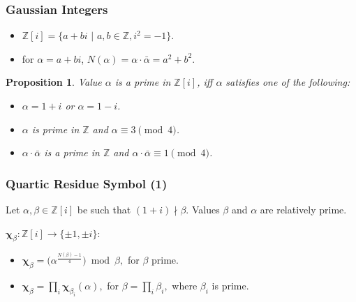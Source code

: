 \documentclass{beamer}
\newtheorem{proposition}{Proposition}
\begin{document}
\begin{frame}
\frametitle{Gaussian Integers}

	\begin{itemize}
		\item $\mathbb{Z}[i]= \{ a + bi$  $|$  $a,b \in \mathbb{Z}, i^2=-1 \}$.
		\item for $\alpha = a+bi$, $N(\alpha) = \alpha \cdot \bar{\alpha} = a^2 + b^2$.
	\end{itemize}
	
	
	\begin{proposition}
		Value $\alpha$ is a prime in  $\mathbb{Z}[i]$, iff 
		$\alpha$ satisfies one of the following:
		\begin{itemize}
			\item $\alpha = 1+i$ or $\alpha= 1-i$.
			\item $\alpha$ is prime in $\mathbb{Z}$ and $\alpha \equiv 3 \pmod{4}$.
			\item $\alpha \cdot \bar{\alpha}$ is a prime in $\mathbb{Z}$ and 
			$\alpha \cdot \bar{\alpha} \equiv 1 \pmod{4}$.
		\end{itemize}  
	\end{proposition}
	


\end{frame}


\begin{frame}
\frametitle{Quartic Residue Symbol (1)}

\begin{definition}
 				Let $\alpha,\beta \in \mathbb{Z}[{i}]$ be such that $(1+i) \nmid \beta$. Values $\beta$ and $\alpha$ are relatively prime. 
 				 
 				\bigskip
 				 				 
 				$\mathbf{\chi}_{\beta} : \mathbb{Z}[{i}] \to \{\pm 1, \pm i\}$: 
 				\begin{itemize}
 					\item $\mathbf{\chi}_{\beta} = (\alpha^{\frac{N(\beta)-1}{4}}\big)\bmod \beta,$ for $\beta$ prime.
 					\item $\mathbf{\chi}_{\beta} = \prod _{i} \mathbf{\chi}_{\beta _{i}}(\alpha),$ for $\beta = \prod _ {i} \beta _{i},$ where $\beta_{i}$ is prime.
 				\end{itemize}
\end{definition}

\end{frame}

\end{document}
